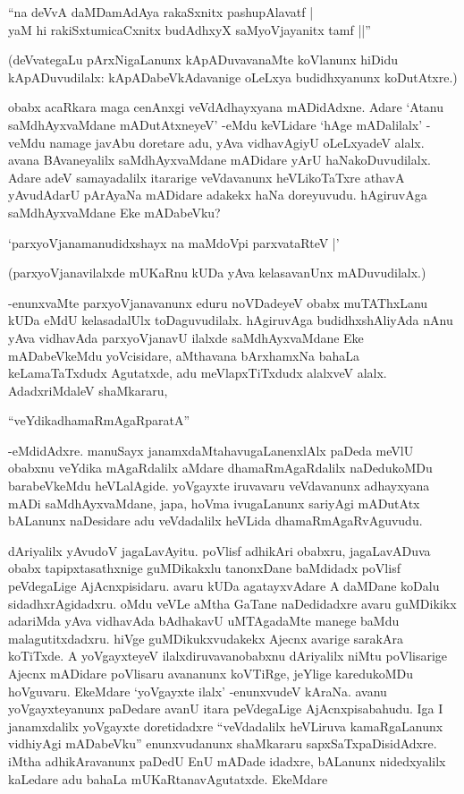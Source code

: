 \begin{shloka}
``na deVvA daMDamAdAya rakaSxnitx pashupAlavatf |\\
yaM hi rakiSxtumicaCxnitx budAdhxyX saMyoVjayanitx tamf ||''
\end{shloka}

(deVvategaLu pArxNigaLanunx kApADuvavanaMte koVlanunx hiDidu kApADuvudilalx: kApADabeVkAdavanige oLeLxya budidhxyanunx koDutAtxre.)


obabx acaRkara maga cenAnxgi veVdAdhayxyana mADidAdxne. Adare `Atanu saMdhAyxvaMdane mADutAtxneyeV' -eMdu keVLidare `hAge mADalilalx' -veMdu namage javAbu doretare adu, yAva vidhavAgiyU oLeLxyadeV alalx. avana BAvaneyalilx saMdhAyxvaMdane mADidare yArU haNakoDuvudilalx. Adare adeV samayadalilx itararige veVdavanunx heVLikoTaTxre athavA yAvudAdarU pArAyaNa mADidare adakekx haNa doreyuvudu. hAgiruvAga saMdhAyxvaMdane Eke mADabeVku?

\begin{shloka}
`parxyoVjanamanudidxshayx na maMdoV\s pi parxvataRteV |'
\end{shloka}

(parxyoVjanavilalxde mUKaRnu kUDa yAva kelasavanUnx mADuvudilalx.)

-enunxvaMte parxyoVjanavanunx eduru noVDadeyeV obabx muTAThxLanu kUDa eMdU kelasadalUlx toDaguvudilalx. hAgiruvAga budidhxshAliyAda nAnu yAva vidhavAda parxyoVjanavU ilalxde saMdhAyxvaMdane Eke mADabeVkeMdu yoVcisidare, aMthavana bArxhamxNa bahaLa keLamaTaTxdudx Agutatxde, adu meVlapxTiTxdudx alalxveV alalx. AdadxriMdaleV shaMkararu,

\begin{shloka}
``veYdikadhamaRmAgaRparatA''
\end{shloka}

-eMdidAdxre. manuSayx janamxdaMtahavugaLanenxlAlx paDeda meVlU obabxnu veYdika mAgaRdalilx aMdare dhamaRmAgaRdalilx naDedukoMDu barabeVkeMdu heVLalAgide. yoVgayxte iruvavaru veVdavanunx adhayxyana mADi saMdhAyxvaMdane, japa, hoVma ivugaLanunx sariyAgi mADutAtx bALanunx naDesidare adu veVdadalilx heVLida dhamaRmAgaRvAguvudu.

dAriyalilx yAvudoV jagaLavAyitu. poVlisf adhikAri obabxru, jagaLavADuva obabx tapipxtasathxnige guMDikakxlu tanonxDane baMdidadx poVlisf peVdegaLige AjAcnxpisidaru. avaru kUDa agatayxvAdare A daMDane koDalu sidadhxrAgidadxru. oMdu veVLe aMtha GaTane naDedidadxre avaru guMDikikx adariMda yAva vidhavAda bAdhakavU uMTAgadaMte manege baMdu malagutitxdadxru. hiVge guMDikukxvudakekx Ajecnx avarige sarakAra koTiTxde. A yoVgayxteyeV ilalxdiruvavanobabxnu dAriyalilx niMtu poVlisarige Ajecnx mADidare poVlisaru avananunx koVTiRge, jeYlige karedukoMDu hoVguvaru. EkeMdare `yoVgayxte ilalx' -enunxvudeV kAraNa. avanu yoVgayxteyanunx paDedare avanU itara peVdegaLige AjAcnxpisabahudu. Iga I janamxdalilx yoVgayxte doretidadxre ``veVdadalilx heVLiruva kamaRgaLanunx vidhiyAgi mADabeVku'' enunxvudanunx shaMkararu sapxSaTxpaDisidAdxre. iMtha adhikAravanunx paDedU EnU mADade idadxre, bALanunx nidedxyalilx kaLedare adu bahaLa mUKaRtanavAgutatxde. EkeMdare

